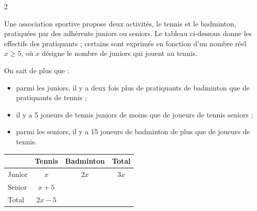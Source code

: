 \documentclass[10pt,a4paper]{article}
\begin{document}
\begin{multicols}{2}

\begin{exo}
Une association sportive propose deux activités, le tennis et le badminton, pratiquées par des adhérents juniors ou seniors. Le tableau ci-dessous donne les effectifs des pratiquants ; certains sont exprimés en fonction d'un nombre réel \(x \geq 5\), où \(x\) désigne le nombre de juniors qui jouent au tennis.

On sait de plus que :

\begin{itemize}
    \item parmi les juniors, il y a deux fois plus de pratiquants de badminton que de pratiquants de tennis ;
    \item il y a 5 joueurs de tennis juniors de moins que de joueurs de tennis seniors ;
    \item parmi les seniors, il y a 15 joueurs de badminton de plus que de joueurs de tennis.
\end{itemize}

\smallskip

\begin{center}
\begin{tabular}{|l|c|c|c|}
    \hline
     & Tennis & Badminton & Total \\
    \hline
    Junior & \(x\) & \(2x\) & \(3x\) \\
    \hline
    Senior & \(x+5\) &  &  \\
    \hline
    Total & \(2x-5\) &  &  \\
    \hline
\end{tabular}
\end{center}




\end{exo}
\end{multicols}
\end{document}
